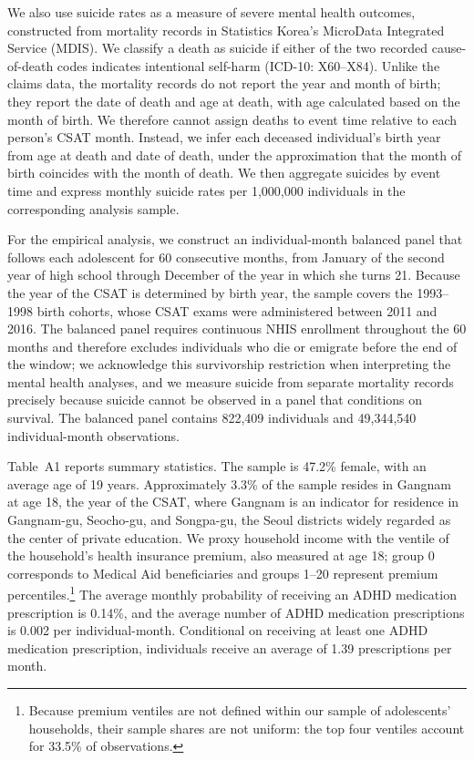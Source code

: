 \documentclass[12pt]{article}
\begin{document}
We also use suicide rates as a measure of severe mental health outcomes, constructed from mortality records in Statistics Korea's MicroData Integrated Service (MDIS). We classify a death as suicide if either of the two recorded cause-of-death codes indicates intentional self-harm (ICD-10: X60--X84). Unlike the claims data, the mortality records do not report the year and month of birth; they report the date of death and age at death, with age calculated based on the month of birth. We therefore cannot assign deaths to event time relative to each person's CSAT month. Instead, we infer each deceased individual's birth year from age at death and date of death, under the approximation that the month of birth coincides with the month of death. We then aggregate suicides by event time and express monthly suicide rates per 1,000,000 individuals in the corresponding analysis sample.

For the empirical analysis, we construct an individual-month balanced panel that follows each adolescent for 60 consecutive months, from January of the second year of high school through December of the year in which she turns 21. Because the year of the CSAT is determined by birth year, the sample covers the 1993--1998 birth cohorts, whose CSAT exams were administered between 2011 and 2016. The balanced panel requires continuous NHIS enrollment throughout the 60 months and therefore excludes individuals who die or emigrate before the end of the window; we acknowledge this survivorship restriction when interpreting the mental health analyses, and we measure suicide from separate mortality records precisely because suicide cannot be observed in a panel that conditions on survival. The balanced panel contains 822,409 individuals and 49,344,540 individual-month observations.

Table~A1 reports summary statistics. The sample is 47.2\% female, with an average age of 19 years. Approximately 3.3\% of the sample resides in Gangnam at age 18, the year of the CSAT, where Gangnam is an indicator for residence in Gangnam-gu, Seocho-gu, and Songpa-gu, the Seoul districts widely regarded as the center of private education. We proxy household income with the ventile of the household's health insurance premium, also measured at age 18; group 0 corresponds to Medical Aid beneficiaries and groups 1--20 represent premium percentiles.\footnote{Because premium ventiles are not defined within our sample of adolescents' households, their sample shares are not uniform: the top four ventiles account for 33.5\% of observations.} The average monthly probability of receiving an ADHD medication prescription is 0.14\%, and the average number of ADHD medication prescriptions is 0.002 per individual-month. Conditional on receiving at least one ADHD medication prescription, individuals receive an average of 1.39 prescriptions per month.
\end{document}
